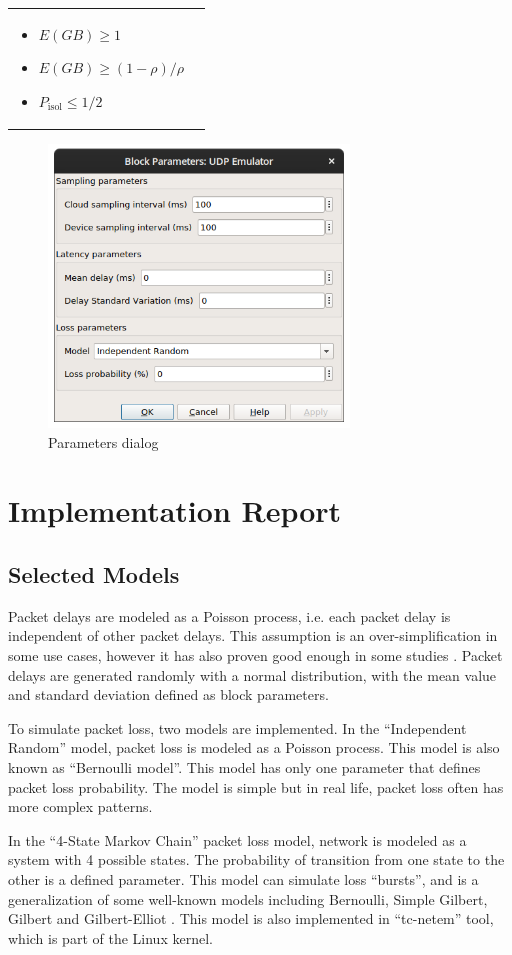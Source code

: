 \documentclass[a4paper, 11pt]{article}
\begin{document}
\begin{enumerate}
\begin{longtable}{l|p{12cm}}
\begin{itemize}
\begin{itemize}
\item $E(GB) \ge 1$
\item $E(GB) \ge (1-\rho)/\rho$
\item $P_\textrm{isol} \le 1/2$
\end{itemize}
\end{itemize}
\end{longtable}
\begin{figure}
\centering
\includegraphics[width=8cm]{img/params-dialog.png}
\caption{Parameters dialog}
\label{dialog}
\end{figure}
\end{enumerate}

\section{Implementation Report}
\subsection{Selected Models}
Packet delays are modeled as a Poisson process, i.e. each packet delay is independent of other packet delays. This assumption is an over-simplification in some use cases, however it has also proven good enough in some studies \cite{Dahmouni2012}. Packet delays are generated randomly with a normal distribution, with the mean value and standard deviation defined as block parameters.

To simulate packet loss, two models are implemented. In the ``Independent Random'' model, packet loss is modeled as a Poisson process. This model is also known as ``Bernoulli model''. This model has only one parameter that defines packet loss probability. The model is simple but in real life, packet loss often has more complex patterns.

In the ``4-State Markov Chain'' packet loss model, network is modeled as a system with 4 possible states. The probability of transition from one state to the other is a defined parameter. This model can simulate loss ``bursts'', and is a generalization of some well-known models including Bernoulli, Simple Gilbert, Gilbert and Gilbert-Elliot \cite{Ludovici2012}. This model is also implemented in ``tc-netem'' tool, which is part of the Linux kernel.
\end{document}
